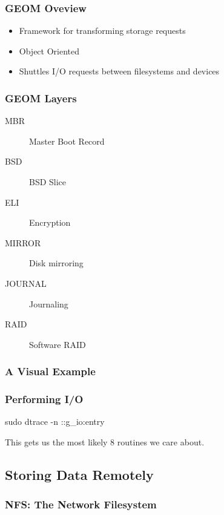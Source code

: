 \documentclass[pdftex]{beamer} %
\begin{document}
\begin{frame}
  \frametitle{GEOM Oveview}
  \begin{itemize}
  \item Framework for transforming storage requests
  \item Object Oriented
  \item Shuttles I/O requests between filesystems and devices
  \end{itemize}
\end{frame}

\begin{frame}
  \frametitle{GEOM Layers}
  \begin{description}
  \item[MBR] Master Boot Record
  \item[BSD] BSD Slice
  \item[ELI] Encryption
  \item[MIRROR] Disk mirroring
  \item[JOURNAL] Journaling
  \item[RAID] Software RAID
\end{description}
\end{frame}

\begin{frame}
  \frametitle{A Visual Example}
  
\end{frame}

\begin{frame}
  \frametitle{Performing I/O}
sudo dtrace -n ::g\_io\*:entry  

This gets us the most likely 8 routines we care about.

\end{frame}

\subsection{Storing Data Remotely}
\label{sec:remote_storage}

\begin{frame}
  \frametitle{NFS: The Network Filesystem}
  
\end{frame}
\end{document}
